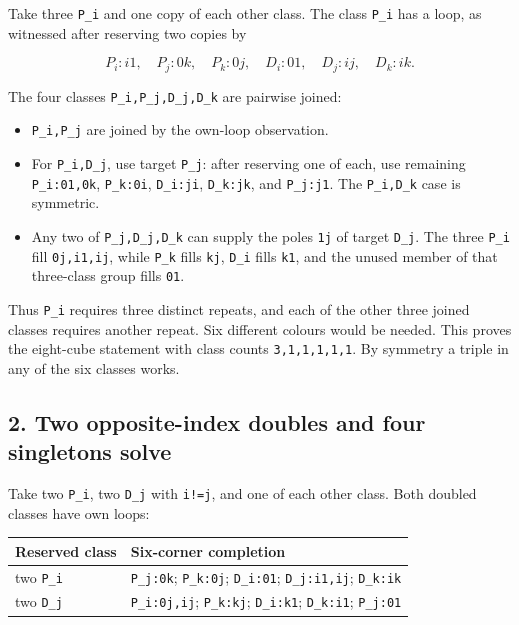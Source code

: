 \documentclass[
  10pt,
]{article}
\providecommand{\tightlist}{%
  \setlength{\itemsep}{0pt}\setlength{\parskip}{0pt}}
\begin{document}
Take three \texttt{P\_i} and one copy of each other class. The class
\texttt{P\_i} has a loop, as witnessed after reserving two copies by

\[
P_i:i1,\quad P_j:0k,\quad P_k:0j,\quad
D_i:01,\quad D_j:ij,\quad D_k:ik.
\]

The four classes \texttt{P\_i,P\_j,D\_j,D\_k} are pairwise joined:

\begin{itemize}
\tightlist
\item
  \texttt{P\_i,P\_j} are joined by the own-loop observation.
\item
  For \texttt{P\_i,D\_j}, use target \texttt{P\_j}: after reserving one
  of each, use remaining \texttt{P\_i:01,0k}, \texttt{P\_k:0i},
  \texttt{D\_i:ji}, \texttt{D\_k:jk}, and \texttt{P\_j:j1}. The
  \texttt{P\_i,D\_k} case is symmetric.
\item
  Any two of \texttt{P\_j,D\_j,D\_k} can supply the poles \texttt{1j} of
  target \texttt{D\_j}. The three \texttt{P\_i} fill \texttt{0j,i1,ij},
  while \texttt{P\_k} fills \texttt{kj}, \texttt{D\_i} fills
  \texttt{k1}, and the unused member of that three-class group fills
  \texttt{01}.
\end{itemize}

Thus \texttt{P\_i} requires three distinct repeats, and each of the
other three joined classes requires another repeat. Six different
colours would be needed. This proves the eight-cube statement with class
counts \texttt{3,1,1,1,1,1}. By symmetry a triple in any of the six
classes works.

\hypertarget{two-opposite-index-doubles-and-four-singletons-solve}{%
\subsection*{2. Two opposite-index doubles and four singletons
solve}\label{two-opposite-index-doubles-and-four-singletons-solve}}

Take two \texttt{P\_i}, two \texttt{D\_j} with \texttt{i!=j}, and one of
each other class. Both doubled classes have own loops:

\begin{longtable}[]{@{}ll@{}}
\toprule\noalign{}
Reserved class & Six-corner completion \\
\midrule\noalign{}
\endhead
\bottomrule\noalign{}
\endlastfoot
two \texttt{P\_i} & \texttt{P\_j:0k}; \texttt{P\_k:0j};
\texttt{D\_i:01}; \texttt{D\_j:i1,ij}; \texttt{D\_k:ik} \\
two \texttt{D\_j} & \texttt{P\_i:0j,ij}; \texttt{P\_k:kj};
\texttt{D\_i:k1}; \texttt{D\_k:i1}; \texttt{P\_j:01} \\
\end{longtable}
\end{document}
